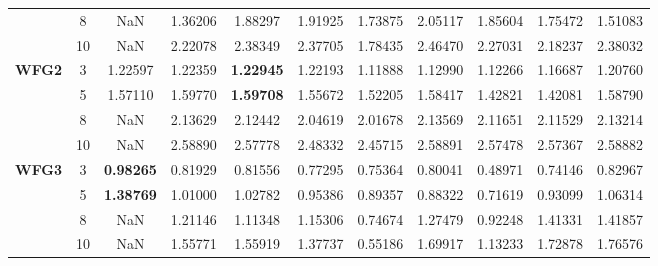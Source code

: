 \documentclass[conference]{IEEEtran}
\begin{document}
\begin{table*}[!htb]
\begin{tabular}{|c|c|c|c|c|c|c|c|c|c|c|}
		& 8          & NaN              & 1.36206           & 1.88297               & 1.91925          & 1.73875             & 2.05117             & 1.85604            & 1.75472              & 1.51083          \\ \cline{2-11} 
		& 10         & NaN              & 2.22078           & 2.38349               & 2.37705          & 1.78435             & 2.46470             & 2.27031            & 2.18237              & 2.38032          \\ \hline
		\multirow{4}{*}{\textbf{WFG2}}  & 3          & 1.22597          & 1.22359           & \textbf{1.22945}      & 1.22193          & 1.11888             & 1.12990             & 1.12266            & 1.16687              & 1.20760          \\ \cline{2-11} 
		& 5          & 1.57110          & 1.59770           & \textbf{1.59708}      & 1.55672          & 1.52205             & 1.58417             & 1.42821            & 1.42081              & 1.58790          \\ \cline{2-11} 
		& 8          & NaN              & 2.13629           & 2.12442               & 2.04619          & 2.01678             & 2.13569             & 2.11651            & 2.11529              & 2.13214          \\ \cline{2-11} 
		& 10         & NaN              & 2.58890           & 2.57778               & 2.48332          & 2.45715             & 2.58891             & 2.57478            & 2.57367              & 2.58882          \\ \hline
		\multirow{4}{*}{\textbf{WFG3}}  & 3          & \textbf{0.98265} & 0.81929           & 0.81556               & 0.77295          & 0.75364             & 0.80041             & 0.48971            & 0.74146              & 0.82967          \\ \cline{2-11} 
		& 5          & \textbf{1.38769} & 1.01000           & 1.02782               & 0.95386          & 0.89357             & 0.88322             & 0.71619            & 0.93099              & 1.06314          \\ \cline{2-11} 
		& 8          & NaN              & 1.21146           & 1.11348               & 1.15306          & 0.74674             & 1.27479             & 0.92248            & 1.41331              & 1.41857          \\ \cline{2-11} 
		& 10         & NaN              & 1.55771           & 1.55919               & 1.37737          & 0.55186             & 1.69917             & 1.13233            & 1.72878              & 1.76576          \\ \hline

\end{tabular}
\end{table*}
\end{document}
